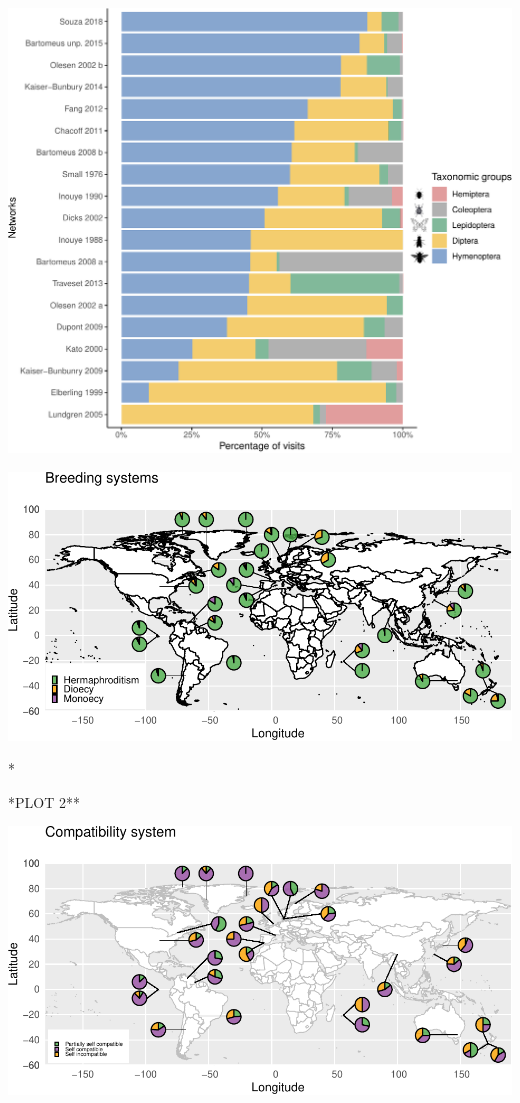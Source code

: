 \documentclass[12pt,]{article}
\begin{document}
\includegraphics{Draft_files/figure-latex/unnamed-chunk-2-1.pdf}

\newpage

\vspace{4cm}

\includegraphics{Draft_files/figure-latex/unnamed-chunk-3-1.pdf}

\newpage
*

*PLOT 2**

\begin{center}\includegraphics{Draft_files/figure-latex/unnamed-chunk-4-1} \end{center}
\end{document}
